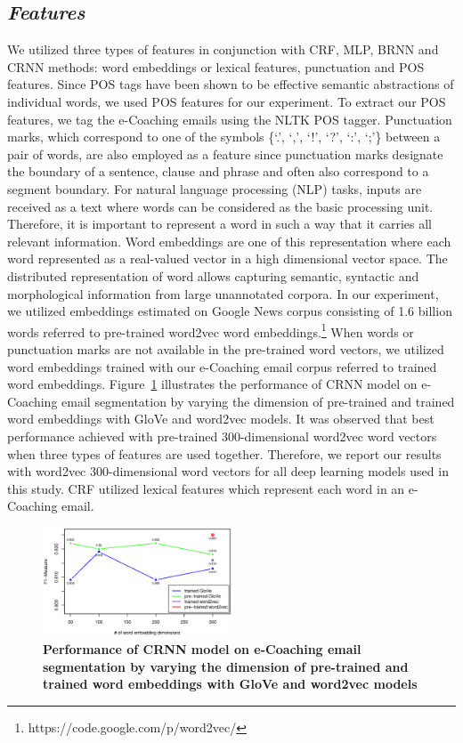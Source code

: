 \documentclass{amia}
\begin{document}
\subsection*{\textit{Features}}

We utilized three types of features in conjunction with CRF, MLP, BRNN and CRNN methods: word embeddings or lexical features, punctuation and POS features. Since POS tags have been shown to be effective semantic abstractions of individual words, we used POS features for our experiment.\cite{liu2005using,treviso2017sentence} To extract our POS features, we tag the e-Coaching emails using the NLTK POS tagger. Punctuation marks, which correspond to one of the symbols \{`.', `,', `!', `?', `:', `;'\} between a pair of words, are also employed as a feature since punctuation marks designate the boundary of a sentence, clause and phrase and often also correspond to a segment boundary.\cite{cho2002text} For natural language processing (NLP) tasks, inputs are received as a text where words can be considered as the basic processing unit. Therefore, it is important to represent a word in such a way that it carries all relevant information. Word embeddings are one of this representation where each word represented as a real-valued vector in a high dimensional vector space. The distributed representation of word allows capturing semantic, syntactic and morphological information from large unannotated corpora.\cite{pennington2014glove, mikolov2013distributed} In our experiment, we utilized embeddings estimated on Google News corpus consisting of 1.6 billion words referred to pre-trained word2vec word embeddings.\footnote{https://code.google.com/p/word2vec/} When words or punctuation marks are not available in the pre-trained word vectors, we utilized word embeddings trained with our e-Coaching email corpus referred to trained word embeddings. Figure~\ref{fig:embedding-dimension} illustrates the performance of CRNN model on e-Coaching email segmentation by varying the dimension of pre-trained and trained word embeddings with GloVe and word2vec models. It was observed that best performance achieved with pre-trained 300-dimensional word2vec word vectors when three types of features are used together. Therefore, we report our results with word2vec 300-dimensional word vectors for all deep learning models used in this study. CRF utilized lexical features which represent each word in an e-Coaching email. 

\begin{figure}[!htb]
    \centering
    \includegraphics[width=0.5\textwidth]{figures/embedding-dimension.eps}
    \caption{\textbf{Performance of CRNN model on e-Coaching email segmentation by varying the dimension of pre-trained and trained word embeddings with GloVe and word2vec models}}
    \label{fig:embedding-dimension}
\end{figure}   
\end{document}
